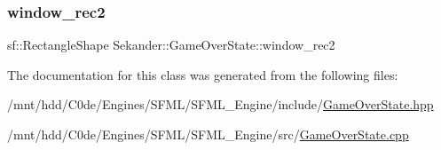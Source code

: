 \mbox{\label{classSekander_1_1GameOverState_afef7263e74fde41d6c779a473fd93105}} 
\subsubsection{\texorpdfstring{window\+\_\+rec2}{window\_rec2}}
{\footnotesize\ttfamily sf\+::\+Rectangle\+Shape Sekander\+::\+Game\+Over\+State\+::window\+\_\+rec2\hspace{0.3cm}{\ttfamily [private]}}



The documentation for this class was generated from the following files\+:\begin{DoxyCompactItemize}
\item 
/mnt/hdd/\+C0de/\+Engines/\+S\+F\+M\+L/\+S\+F\+M\+L\+\_\+\+Engine/include/\hyperlink{GameOverState_8hpp}{Game\+Over\+State.\+hpp}\item 
/mnt/hdd/\+C0de/\+Engines/\+S\+F\+M\+L/\+S\+F\+M\+L\+\_\+\+Engine/src/\hyperlink{GameOverState_8cpp}{Game\+Over\+State.\+cpp}\end{DoxyCompactItemize}
